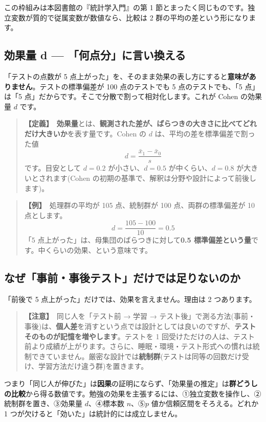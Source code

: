 \documentclass{article}
\begin{document}
この枠組みは本図書館の『統計学入門』の第 1 節とまったく同じものです。独立変数が質的で従属変数が数値なら、比較は 2 群の平均の差という形になります。

\subsection{効果量 d — 「何点分」に言い換える}

「テストの点数が 5 点上がった」を、そのまま効果の表し方にすると\textbf{意味がありません}。テストの標準偏差が 100 点のテストでも 5 点のテストでも、「5 点」は「5 点」だからです。そこで分散で割って相対化します。これが Cohen の効果量 \(d\) です。

\begin{quote}
\textbf{【定義】}\ \textbf{効果量}とは、\textbf{観測された差が、ばらつきの大きさに比べてどれだけ大きいか}を表す量です。Cohen の \(d\) は、平均の差を標準偏差で割った値
\[ d = \frac{\bar{x}_1 - \bar{x}_0}{s} \]
です。目安として \(d = 0.2\) が小さい、\(d = 0.5\) が中くらい、\(d = 0.8\) が大きいとされます(Cohen の初期の基準で、解釈は分野や設計によって前後します)。
\end{quote}

\begin{quote}
\textbf{【例】}\ 処理群の平均が 105 点、統制群が 100 点、両群の標準偏差が 10 点とします。
\[ d = \frac{105 - 100}{10} = 0.5 \]
「5 点上がった」は、母集団のばらつきに対して\textbf{0.5 標準偏差という量}です。中くらいの効果、という意味です。
\end{quote}

\subsection{なぜ「事前・事後テスト」だけでは足りないのか}

「前後で 5 点上がった」だけでは、効果を言えません。理由は 2 つあります。

\begin{quote}
\textbf{【注意】}\ 同じ人を「テスト前 → 学習 → テスト後」で測る方法(事前・事後)は、\textbf{個人差}を消すという点では設計としては良いのですが、\textbf{テストそのものが記憶を増やします}。テストを 1 回受けただけの人は、テスト前より成績が上がります。さらに、睡眠・環境・テスト形式への慣れは統制できていません。厳密な設計では\textbf{統制群}(テストは同等の回数だけ受け、学習方法だけ違う群)を置きます。
\end{quote}

つまり「同じ人が伸びた」は\textbf{因果}の証明にならず、「効果量の推定」は\textbf{群どうしの比較}から得る数値です。勉強の効果を主張するには、①独立変数を操作し、②統制群を置き、③効果量 \(d\)、④標本数 \(n\)、⑤\(p\) 値か信頼区間をそろえる。どれか 1 つが欠けると「効いた」は統計的には成立しません。
\end{document}
